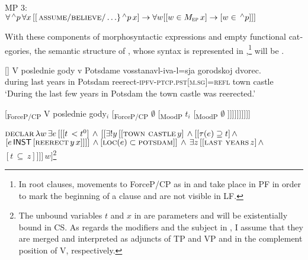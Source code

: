 \documentclass[output=paper,colorlinks,citecolor=brown]{langscibook}
\begin{document}
\begin{otherlanguage}{english}
\begin{exe}
\ex MP 3: \\$\forall  \, ^{\wedge} p \, \forall x \, [[\, \textsc{assume}/\textsc{believe}/ \ldots \} \, ^{\wedge}p \, x] \to \forall w [[w \in M_{\textsc{ep}} \, x] \to [w \in \, ^{\wedge}p]]]       $ \label{kukulka}
\end{exe}

\noindent With these components of morphosyntactic expressions and empty functional categories, the semantic structure of , whose syntax is represented in ,\footnote{In root clauses, movements to ForceP/CP as in  and  take place in PF in order to mark the beginning of a clause and are not visible in LF.} will be .

\begin{exe}
[]{
\gll	V poslednie gody v Potsdame vosstanavl-iva-l=sja gorodskoj dvorec.\\
during last years in Potsdam reerect-\textsc{ipfv}-\textsc{ptcp}.\textsc{pst}[\textsc{m}.\textsc{sg}]=\textsc{refl} town castle \\
\glt `During the last few years in Potsdam the town castle was reerected.'}
\end{exe}


\begin{exe}
\ex {} [\textsubscript{ForceP/CP} V poslednie gody$_i$ [\textsubscript{ForceP/CP} $\emptyset$ [\textsubscript{MoodP} $t_i$ [\textsubscript{MoodP} $\emptyset$ \newline [\textsubscript{TP} $t_i$ [\textsubscript{TP} $\emptyset$ [\textsubscript{PolP} $\emptyset$ [\textsubscript{VP} v Potsdame [\textsubscript{VP} [\textsubscript{V} vosstanavlivalsja] \newline [\textsubscript{DP} $\emptyset$ [\textsubscript{NP} gorodskoj dvorec]]]]]]]]]]] \label{ex:16:14}
\end{exe}

\begin{exe}
\ex $\textsc{declar} \, \lambda w \, \exists e \, [[[t \, < t^0] \, \land \, [[\exists!y \, [[\textsc{town castle} \, y] \, \land [[\tau (e) \supseteq t] \, \land $
    \newline
    $ [e \, \cnst{inst} \, [\textsc{reerect} \, y \, x]]]] \, \land [\textsc{loc}(e)  \subset \textsc{potsdam}]] \, \land \, \exists z \, [[\textsc{last years} \, z] \, \land $
    \newline
    $[t \, \subseteq \, z]]]] \, w]$\footnote{The unbound variables $t$ and $x$ in  are parameters and will be existentially bound in CS. As regards the modifiers and the subject in , I assume that they are merged and interpreted as adjuncts of TP and VP and in the complement position of V, respectively.
    }
\label{ex:16:15}
\end{exe}


\end{otherlanguage}
\end{document}
